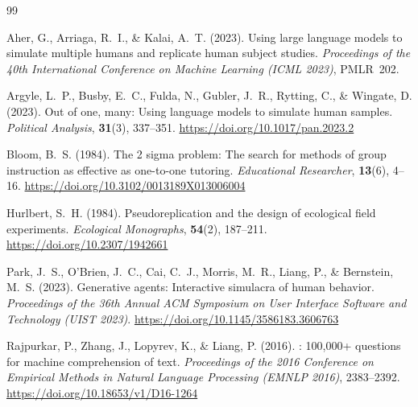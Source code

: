 \documentclass[11pt]{article}
\begin{document}

\begin{thebibliography}{99}

Aher, G., Arriaga, R.~I., \& Kalai, A.~T. (2023).
\newblock Using large language models to simulate multiple humans and replicate
  human subject studies.
\newblock \emph{Proceedings of the 40th International Conference on Machine
  Learning (ICML 2023)}, PMLR~202.

Argyle, L.~P., Busby, E.~C., Fulda, N., Gubler, J.~R., Rytting, C., \&
  Wingate, D. (2023).
\newblock Out of one, many: Using language models to simulate human samples.
\newblock \emph{Political Analysis}, \textbf{31}(3), 337--351.
\newblock \url{https://doi.org/10.1017/pan.2023.2}

Bloom, B.~S. (1984).
\newblock The 2 sigma problem: The search for methods of group instruction as
  effective as one-to-one tutoring.
\newblock \emph{Educational Researcher}, \textbf{13}(6), 4--16.
\newblock \url{https://doi.org/10.3102/0013189X013006004}

Hurlbert, S.~H. (1984).
\newblock Pseudoreplication and the design of ecological field experiments.
\newblock \emph{Ecological Monographs}, \textbf{54}(2), 187--211.
\newblock \url{https://doi.org/10.2307/1942661}

Park, J.~S., O'Brien, J.~C., Cai, C.~J., Morris, M.~R., Liang, P., \&
  Bernstein, M.~S. (2023).
\newblock Generative agents: Interactive simulacra of human behavior.
\newblock \emph{Proceedings of the 36th Annual ACM Symposium on User Interface
  Software and Technology (UIST 2023)}.
\newblock \url{https://doi.org/10.1145/3586183.3606763}

Rajpurkar, P., Zhang, J., Lopyrev, K., \& Liang, P. (2016).
: 100,000+ questions for machine comprehension of text.
\newblock \emph{Proceedings of the 2016 Conference on Empirical Methods in
  Natural Language Processing (EMNLP 2016)}, 2383--2392.
\newblock \url{https://doi.org/10.18653/v1/D16-1264}

\end{thebibliography}
\end{document}
